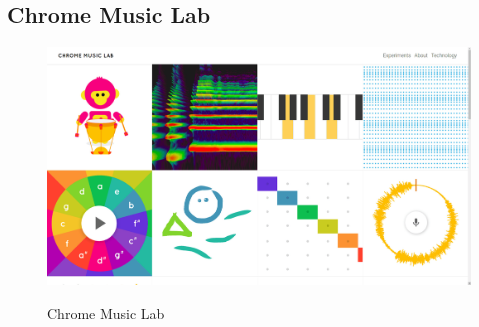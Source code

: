 	\subsection{Chrome Music Lab}
		\begin{figure}[H]
			\centering
			\includegraphics[width=0.8\linewidth]{figure/Analysis/chromeMusicLab.png}
			\label{fig:chromeMusicLab}
			\caption{Chrome Music Lab}
		\end{figure}

		